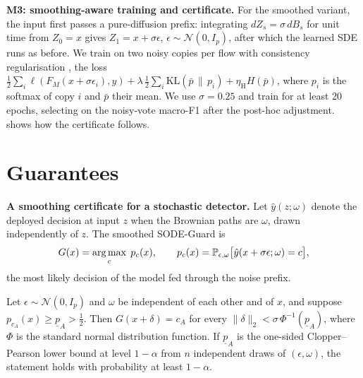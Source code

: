 \textbf{M3: smoothing-aware training and certificate.} For the smoothed
variant, the input first passes a pure-diffusion prefix: integrating
$dZ_s=\sigma\,dB_s$ for unit time from $Z_0=x$ gives $Z_1=x+\sigma\epsilon$,
$\epsilon\sim\mathcal N(0,I_p)$, after which the learned SDE runs as before. We
train on two noisy copies per flow with consistency regularisation
\citep{jeong2020consistency}, the loss
$\tfrac12\sum_i\ell(F_M(x+\sigma\epsilon_i),y)
+\lambda\,\tfrac12\sum_i\mathrm{KL}(\bar p\,\|\,p_i)+\eta_{\mathrm H}H(\bar p)$, where
$p_i$ is the softmax of copy $i$ and $\bar p$ their mean. We use $\sigma=0.25$
and train for at least 20 epochs, selecting on the noisy-vote macro-F1 after
the post-hoc adjustment.  shows how the certificate follows.

\section{Guarantees}\label{sec:theory}
\textbf{A smoothing certificate for a stochastic detector.} Let
$\hat y(z;\omega)$ denote the deployed decision at input $z$ when the Brownian
paths are $\omega$, drawn independently of $z$. The smoothed SODE-Guard is
\begin{equation}\label{eq:smoothed}
  G(x)=\operatorname*{arg\,max}_c\;p_c(x),\qquad p_c(x)=\mathbb{P}_{\epsilon,\omega}\bigl[\hat y(x+\sigma\epsilon;\omega)=c\bigr],
\end{equation}
the most likely decision of the model fed through the noise prefix.

\begin{proposition}\label{prop:smooth}
Let $\epsilon\sim\mathcal N(0,I_p)$ and $\omega$ be independent of each other
and of $x$, and suppose $p_{c_A}(x)\ge\underline p_A>\tfrac12$. Then
$G(x+\delta)=c_A$ for every $\|\delta\|_2<\sigma\,\Phi^{-1}(\underline p_A)$,
where $\Phi$ is the standard normal distribution function. If
$\underline p_A$ is the one-sided Clopper--Pearson lower bound at level
$1-\alpha$ from $n$ independent draws of $(\epsilon,\omega)$, the statement holds
with probability at least $1-\alpha$.
\end{proposition}

